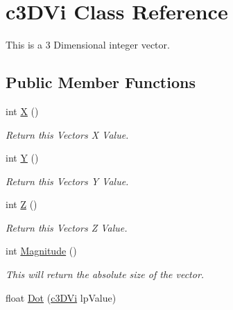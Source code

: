\hypertarget{classc3_d_vi}{
\section{c3DVi Class Reference}
\label{classc3_d_vi}
}


This is a 3 Dimensional integer vector.  


\subsection*{Public Member Functions}
\begin{DoxyCompactItemize}
\item 
\hypertarget{classc3_d_vi_a48d2e23a5d34d8195005e1a30cc3f510}{
int \hyperlink{classc3_d_vi_a48d2e23a5d34d8195005e1a30cc3f510}{X} ()}
\label{classc3_d_vi_a48d2e23a5d34d8195005e1a30cc3f510}

\begin{DoxyCompactList}\small\item\em Return this Vectors X Value. \end{DoxyCompactList}\item 
\hypertarget{classc3_d_vi_a16c022d1fc9fc02fe10720bbf6892326}{
int \hyperlink{classc3_d_vi_a16c022d1fc9fc02fe10720bbf6892326}{Y} ()}
\label{classc3_d_vi_a16c022d1fc9fc02fe10720bbf6892326}

\begin{DoxyCompactList}\small\item\em Return this Vectors Y Value. \end{DoxyCompactList}\item 
\hypertarget{classc3_d_vi_a050be10d1a72504eac701006415ba569}{
int \hyperlink{classc3_d_vi_a050be10d1a72504eac701006415ba569}{Z} ()}
\label{classc3_d_vi_a050be10d1a72504eac701006415ba569}

\begin{DoxyCompactList}\small\item\em Return this Vectors Z Value. \end{DoxyCompactList}\item 
\hypertarget{classc3_d_vi_a7ec516ee9fdf67fa8b2791a41038c114}{
int \hyperlink{classc3_d_vi_a7ec516ee9fdf67fa8b2791a41038c114}{Magnitude} ()}
\label{classc3_d_vi_a7ec516ee9fdf67fa8b2791a41038c114}

\begin{DoxyCompactList}\small\item\em This will return the absolute size of the vector. \end{DoxyCompactList}\item 
\hypertarget{classc3_d_vi_a9fb16378b5ebfd7b5a3ad0b18b0c36fe}{
float \hyperlink{classc3_d_vi_a9fb16378b5ebfd7b5a3ad0b18b0c36fe}{Dot} (\hyperlink{classc3_d_vi}{c3DVi} lpValue)}
\label{classc3_d_vi_a9fb16378b5ebfd7b5a3ad0b18b0c36fe}


\end{DoxyCompactItemize}
